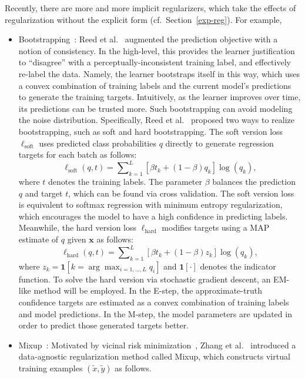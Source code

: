 Recently, there are more and more implicit regularizers, which take the effects of regularization without the explicit form (cf.~Section~\ref{exp-reg}).
For example,
\begin{itemize}[leftmargin=*]
\item Bootstrapping~: Reed et al.~
augmented the prediction objective with a notion of consistency. In the
high-level, this provides the learner justification to ``disagree'' with a
perceptually-inconsistent training label, and effectively re-label the data.
Namely, the learner bootstraps itself in this way, which uses a convex
combination of training labels and the current model’s predictions to generate
the training targets. Intuitively, as the learner improves over time, its
predictions can be trusted more. Such bootstrapping can avoid modeling the noise
distribution. Specifically, Reed et al.~ proposed two ways
to realize bootstrapping, such as soft and hard bootstrapping. The soft version
loss $\ell_{\text{soft}}$ uses predicted class probabilities $q$ directly to
generate regression targets for each batch as follows:
\begin{equation*}
\ell_{\text{soft}}(q,t) 
= \sum\nolimits_{k=1}^{L}[\beta t_k + (1-\beta)q_k]\log(q_k),
\end{equation*}
where $t$ denotes the training labels.
The parameter $\beta$ balances the prediction $q$ and target $t$, which can be found via cross validation. The soft version loss is equivalent to softmax regression with minimum entropy regularization, which encourages the model to have a high confidence in predicting labels. Meanwhile, the hard version loss $\ell_{\text{hard}}$ modifies targets using a MAP estimate of $q$ given $\mathbf{x}$ as follows:
\begin{equation*}
\ell_{\text{hard}}(q,t) 
= \sum\nolimits_{k=1}^{L}[\beta t_k + (1-\beta)z_k]\log(q_k),
\end{equation*}
where $z_k = \mathbf{1}[k=\arg\max_{i = 1,\ldots,L} q_i]$ and $\mathbf{1}[\cdot]$ denotes the indicator function. To solve the hard version via stochastic gradient descent, an EM-like method will be employed. In the E-step, the approximate-truth confidence targets are estimated as a convex combination of training labels and model predictions. In the M-step, the model parameters are updated in order to predict those generated targets better.
\item Mixup~: Motivated by vicinal risk minimization~, Zhang et al.~ introduced a data-agnostic regularization method called Mixup, which constructs virtual training examples $(\tilde{x},\tilde{y})$ as follows.

\end{itemize}
